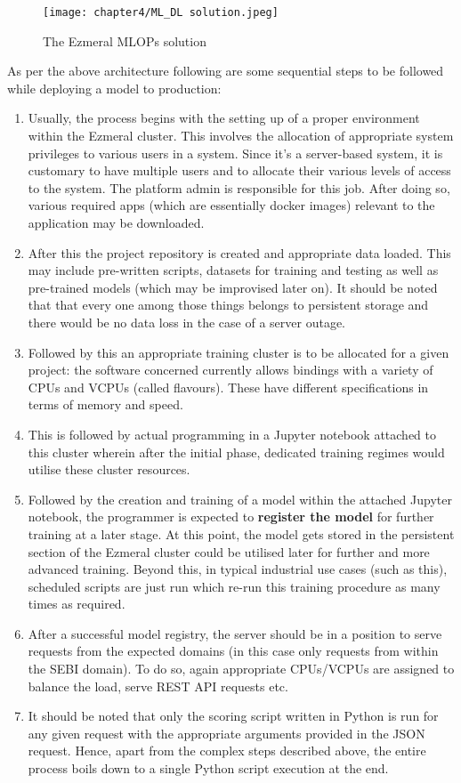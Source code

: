 \begin{figure}[h]
  \centering
  \texttt{[image: chapter4/ML\_DL solution.jpeg]}
  \caption{The Ezmeral MLOPs solution}
  \label{fig:ml_dl_sol}
\end{figure}

As per the above architecture following are some sequential steps to be followed while deploying a model to production: \cite{Chiang2020}

\begin{enumerate}
\item Usually, the process begins with the setting up of a proper environment within the Ezmeral cluster. This involves the allocation of appropriate system privileges to various users in a system. Since it’s a server-based system, it is customary to have multiple users and to allocate their various levels of access to the system. The platform admin is responsible for this job. After doing so, various required apps (which are essentially docker images) relevant to the application may be downloaded.
\item After this the project repository is created and appropriate data loaded. This may include pre-written scripts, datasets for training and testing as well as pre-trained models (which may be improvised later on). It should be noted that that every one among those things belongs to persistent storage and there would be no data loss in the case of a server outage.
\item Followed by this an appropriate training cluster is to be allocated for a given project: the software concerned currently allows bindings with a variety of CPUs and VCPUs (called flavours). These have different specifications in terms of memory and speed.
\item  This is followed by actual programming in a Jupyter notebook attached to this cluster wherein after the initial phase, dedicated training regimes would utilise these cluster resources.
\item  Followed by the creation and training of a model within the attached Jupyter notebook, the programmer is expected to \textbf{register the model} for further training at a later stage. At this point, the model gets stored in the persistent section of the Ezmeral cluster could be utilised later for further and more advanced training. Beyond this, in typical industrial use cases (such as this), scheduled scripts are just run which re-run this training procedure as many times as required.
\item  After a successful model registry, the server should be in a position to serve requests from the expected domains (in this case only requests from within the SEBI domain). To do so, again appropriate CPUs/VCPUs are assigned to balance the load, serve REST API requests etc.
\item It should be noted that only the scoring script written in Python is run for any given request with the appropriate arguments provided in the JSON request. Hence, apart from the complex steps described above, the entire process boils down to a single Python script execution at the end. \par


\end{enumerate}
